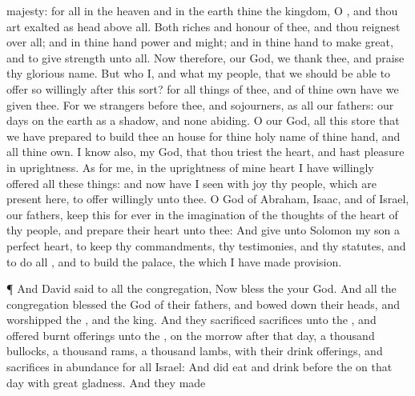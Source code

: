 {majesty: for all
{} in the
heaven and in the
earth
{} thine
{} the
kingdom, O
{}, and thou art
exalted as
head above all.
Both
riches and
honour
{} of
thee, and thou
reignest over all; and in thine
hand
{}
power and
might; and in thine
hand
{} to make
great, and to give
strength unto all.
Now therefore, our
God, we
thank thee, and
praise thy
glorious
name.
But who
{} I, and what
{} my
people, that we should
be
able to offer so
willingly after this sort? for all things
{} of thee, and of thine
own have we
given thee.
For we
{}
strangers
before thee, and
sojourners, as
{} all our
fathers: our
days on the
earth
{} as a
shadow, and
{} none
abiding.
O
{} our
God, all this
store that we have
prepared to
build thee an
house for thine
holy
name
{} of thine
hand, and
{} all thine own.
I
know also, my
God, that thou
triest the
heart, and hast
pleasure in
uprightness. As for me, in the
uprightness of mine
heart I have willingly
offered all these things: and now have I
seen with
joy thy
people, which are
present here, to offer
willingly unto thee.
O
{}
God of
Abraham,
Isaac, and of
Israel, our
fathers,
keep this for
ever in the
imagination of the
thoughts of the
heart of thy
people, and
prepare their
heart unto thee:
And
give unto
Solomon my
son a
perfect
heart, to
keep thy
commandments, thy
testimonies, and thy
statutes, and to
do all
{}, and to
build the
palace,
{} the which I have made
provision.
\par }{\PP {}¶ And
David
said to all the
congregation, Now
bless the
{} your
God. And all the
congregation
blessed the
{}
God of their
fathers, and bowed down their
heads, and
worshipped the
{}, and the
king.
And they
sacrificed
sacrifices unto the
{}, and
offered burnt
offerings unto the
{}, on the
morrow after that
day,
{} a
thousand
bullocks, a
thousand
rams,
{} a
thousand
lambs, with their drink
offerings, and
sacrifices in
abundance for all
Israel:
And did
eat and
drink
before the
{} on that
day with
great
gladness. And they made
}
